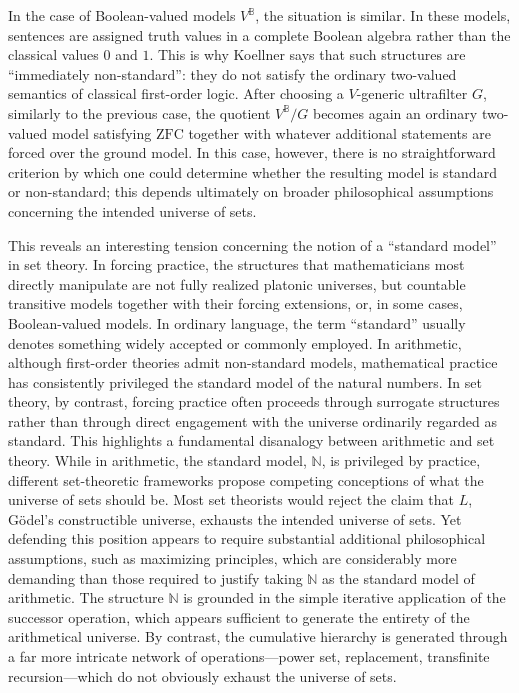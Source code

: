 \documentclass[11pt,a4paper]{book}
\theoremstyle{plain}
\begin{document}
In the case of Boolean-valued models \(V^{\mathbb{B}}\), the situation is similar. In these models, sentences are assigned truth values in a complete Boolean algebra rather than the classical values \(0\) and \(1\). This is why Koellner says that such structures are ``immediately non-standard'': they do not satisfy the ordinary two-valued semantics of classical first-order logic. After choosing a \(V\)-generic ultrafilter \(G\), similarly to the previous case, the quotient \(V^{\mathbb{B}}/G\) becomes again an ordinary two-valued model satisfying \(\mathrm{ZFC}\) together with whatever additional statements are forced over the ground model. In this case, however, there is no straightforward criterion by which one could determine whether the resulting model is standard or non-standard; this depends ultimately on broader philosophical assumptions concerning the intended universe of sets.

This reveals an interesting tension concerning the notion of a ``standard model'' in set theory. In forcing practice, the structures that mathematicians most directly manipulate are not fully realized platonic universes, but countable transitive models together with their forcing extensions, or, in some cases, Boolean-valued models. In ordinary language, the term ``standard'' usually denotes something widely accepted or commonly employed. In arithmetic, although first-order theories admit non-standard models, mathematical practice has consistently privileged the standard model of the natural numbers. In set theory, by contrast, forcing practice often proceeds through surrogate structures rather than through direct engagement with the universe ordinarily regarded as standard.
This highlights a fundamental disanalogy between arithmetic and set theory. While in arithmetic, the standard model, \(\mathbb{N}\), is privileged by practice, different set-theoretic frameworks propose competing conceptions of what the universe of sets should be. Most set theorists would reject the claim that \(L\), Gödel's constructible universe, exhausts the intended universe of sets. Yet defending this position appears to require substantial additional philosophical assumptions, such as maximizing principles, which are considerably more demanding than those required to justify taking \(\mathbb{N}\) as the standard model of arithmetic. The structure \(\mathbb{N}\) is grounded in the simple iterative application of the successor operation, which appears sufficient to generate the entirety of the arithmetical universe. By contrast, the cumulative hierarchy is generated through a far more intricate network of operations---power set, replacement, transfinite recursion---which do not obviously exhaust the universe of sets.
\end{document}
